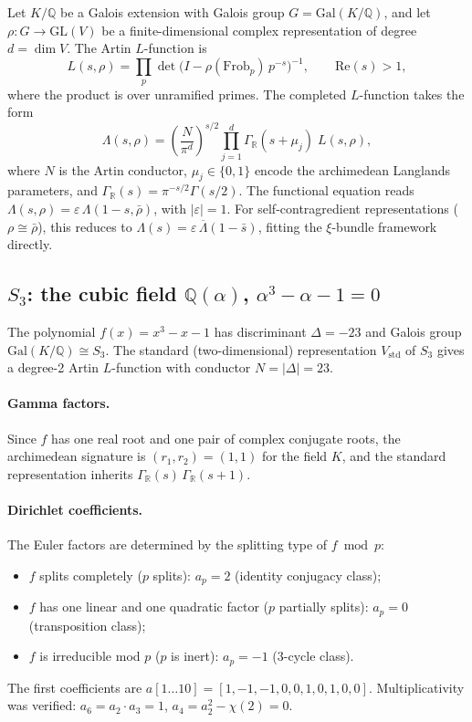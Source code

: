 \documentclass[11pt, a4paper]{article}
\theoremstyle{plain}
\theoremstyle{definition}
\newcommand{\abs}[1]{\left|#1\right|}
\newcommand{\Lam}{\Lambda}             %
\newcommand{\Gal}{\mathrm{Gal}}       %
\newcommand{\Frob}{\mathrm{Frob}}     %
\begin{document}
Let $K/\mathbb{Q}$ be a Galois extension with Galois group $G =
\Gal(K/\mathbb{Q})$, and let $\rho\colon G \to \mathrm{GL}(V)$ be a
finite-dimensional complex representation of degree $d = \dim V$.
The Artin $L$-function is
\[
  L(s, \rho) = \prod_{p} \det\!\bigl(I - \rho(\Frob_{p})\,p^{-s}
  \bigr)^{-1},
  \qquad \mathrm{Re}(s) > 1,
\]
where the product is over unramified primes.  The completed
$L$-function takes the form
\[
  \Lam(s, \rho) = \left(\frac{N}{\pi^{d}}\right)^{s/2}
  \prod_{j=1}^{d} \Gamma_{\mathbb{R}}(s + \mu_{j})\;L(s,\rho),
\]
where $N$ is the Artin conductor, $\mu_{j} \in \{0,1\}$ encode the
archimedean Langlands parameters, and $\Gamma_{\mathbb{R}}(s) =
\pi^{-s/2}\Gamma(s/2)$.  The functional equation reads
$\Lam(s,\rho) = \varepsilon\,\Lam(1-s,\bar{\rho})$, with
$\abs{\varepsilon}=1$.  For self-contragredient representations
($\rho \cong \bar{\rho}$), this reduces to
$\Lam(s) = \varepsilon\,\overline{\Lam}(1-\bar{s})$, fitting the
$\xi$-bundle framework directly.


\subsection{$S_{3}$: the cubic field $\mathbb{Q}(\alpha)$, $\alpha^{3}-\alpha-1=0$}
\label{sec:s3-setup}

The polynomial $f(x) = x^{3}-x-1$ has discriminant $\Delta = -23$
and Galois group $\Gal(K/\mathbb{Q}) \cong S_{3}$.  The standard
(two-dimensional) representation $V_{\mathrm{std}}$ of $S_{3}$ gives
a degree-2 Artin $L$-function with conductor $N = \abs{\Delta} = 23$.

\paragraph{Gamma factors.}
Since $f$ has one real root and one pair of complex conjugate roots,
the archimedean signature is $(r_{1}, r_{2}) = (1, 1)$ for the field
$K$, and the standard representation inherits
$\Gamma_{\mathbb{R}}(s)\,\Gamma_{\mathbb{R}}(s+1)$.

\paragraph{Dirichlet coefficients.}
The Euler factors are determined by the splitting type of $f \bmod p$:
\begin{itemize}
  \item $f$ splits completely ($p$ splits): $a_{p} = 2$ (identity conjugacy class);
  \item $f$ has one linear and one quadratic factor ($p$ partially splits):
    $a_{p} = 0$ (transposition class);
  \item $f$ is irreducible mod $p$ ($p$ is inert): $a_{p} = -1$ (3-cycle class).
\end{itemize}
The first coefficients are $a[1\ldots10] = [1, -1, -1, 0, 0, 1, 0, 1, 0, 0]$.
Multiplicativity was verified: $a_{6} = a_{2}\cdot a_{3} = 1$,
$a_{4} = a_{2}^{2} - \chi(2) = 0$.
\end{document}
